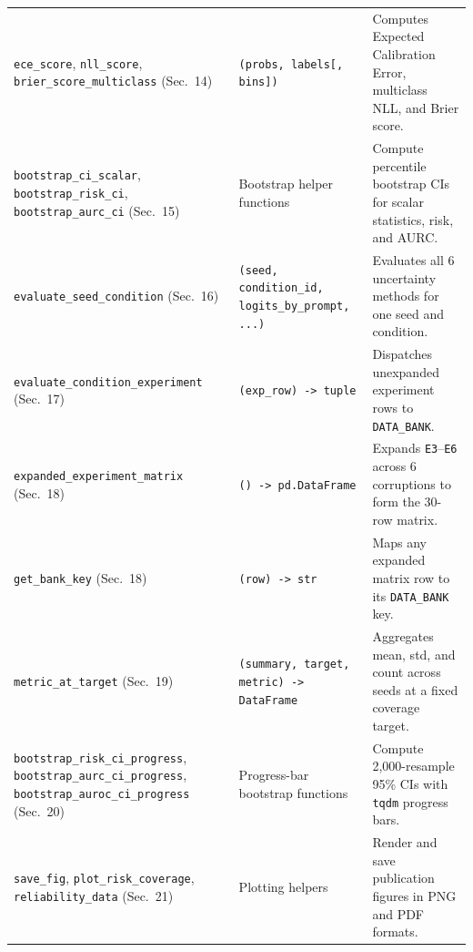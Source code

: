 \documentclass[11pt,a4paper]{article}
\begin{document}
\begin{small}
\begin{longtable}{L{0.29\textwidth} L{0.26\textwidth} L{0.36\textwidth}}
\texttt{ece\_\allowbreak{}score}, \texttt{nll\_\allowbreak{}score}, \texttt{brier\_\allowbreak{}score\_\allowbreak{}multiclass} (Sec.~14) & \texttt{(\allowbreak{}probs,\allowbreak{} labels[,\allowbreak{} bins])} & Computes Expected Calibration Error, multiclass NLL, and Brier score. \\
\texttt{bootstrap\_\allowbreak{}ci\_\allowbreak{}scalar}, \texttt{bootstrap\_\allowbreak{}risk\_\allowbreak{}ci}, \texttt{bootstrap\_\allowbreak{}aurc\_\allowbreak{}ci} (Sec.~15) & Bootstrap helper functions & Compute percentile bootstrap CIs for scalar statistics, risk, and AURC. \\
\texttt{evaluate\_\allowbreak{}seed\_\allowbreak{}condition} (Sec.~16) & \texttt{(\allowbreak{}seed,\allowbreak{} condition\_\allowbreak{}id,\allowbreak{} logits\_\allowbreak{}by\_\allowbreak{}prompt,\allowbreak{} .\allowbreak{}.\allowbreak{}.\allowbreak{})} & Evaluates all 6 uncertainty methods for one seed and condition. \\
\texttt{evaluate\_\allowbreak{}condition\_\allowbreak{}experiment} (Sec.~17) & \texttt{(\allowbreak{}exp\_\allowbreak{}row) -> tuple} & Dispatches unexpanded experiment rows to \texttt{DATA\_\allowbreak{}BANK}. \\
\texttt{expanded\_\allowbreak{}experiment\_\allowbreak{}matrix} (Sec.~18) & \texttt{(\allowbreak{}) -> pd.\allowbreak{}DataFrame} & Expands \texttt{E3}--\texttt{E6} across 6 corruptions to form the 30-row matrix. \\
\texttt{get\_\allowbreak{}bank\_\allowbreak{}key} (Sec.~18) & \texttt{(\allowbreak{}row) -> str} & Maps any expanded matrix row to its \texttt{DATA\_\allowbreak{}BANK} key. \\
\texttt{metric\_\allowbreak{}at\_\allowbreak{}target} (Sec.~19) & \texttt{(\allowbreak{}summary,\allowbreak{} target,\allowbreak{} metric) -> DataFrame} & Aggregates mean, std, and count across seeds at a fixed coverage target. \\
\texttt{bootstrap\_\allowbreak{}risk\_\allowbreak{}ci\_\allowbreak{}progress}, \texttt{bootstrap\_\allowbreak{}aurc\_\allowbreak{}ci\_\allowbreak{}progress}, \texttt{bootstrap\_\allowbreak{}auroc\_\allowbreak{}ci\_\allowbreak{}progress} (Sec.~20) & Progress-bar bootstrap functions & Compute 2,000-resample 95\% CIs with \texttt{tqdm} progress bars. \\
\texttt{save\_\allowbreak{}fig}, \texttt{plot\_\allowbreak{}risk\_\allowbreak{}coverage}, \texttt{reliability\_\allowbreak{}data} (Sec.~21) & Plotting helpers & Render and save publication figures in PNG and PDF formats. \\

\end{longtable}
\end{small}
\end{document}
